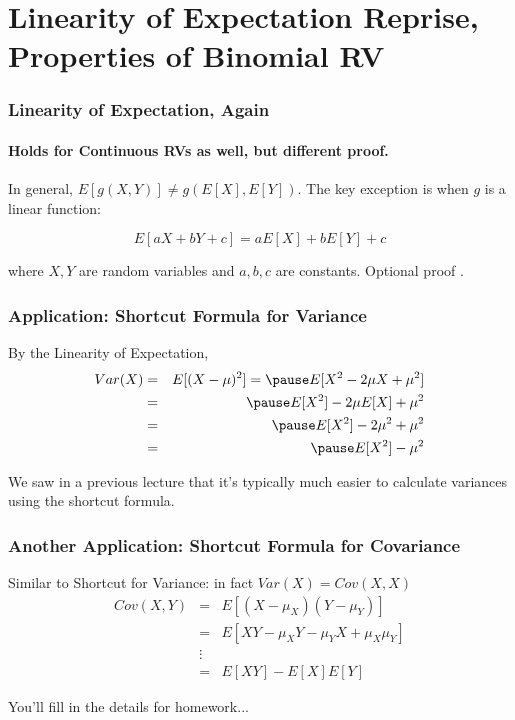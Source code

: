\section{Linearity of Expectation Reprise, Properties of Binomial RV}

\begin{frame}
\frametitle{Linearity of Expectation, Again}
\framesubtitle{Holds for Continuous RVs as well, but different proof.}
In general, $E[g(X,Y)]\neq g(E[X],E[Y])$. The key exception is when $g$ is a linear function:

\Large
$$\boxed{E[aX + bY + c] = aE[X] + bE[Y] + c}$$

\normalsize
where $X,Y$ are random variables and $a,b,c$ are constants.
Optional proof \textcolor{blue}{\href{http://ditraglia.com/Econ103Public/OptionalProofs.pdf}{}}.
\end{frame}

\begin{frame}
\frametitle{Application: Shortcut Formula for Variance}

By the Linearity of Expectation, 
\begin{eqnarray*}
	Var(X) &=&  E[(X - \mu)^2] = \pause E[X^2 - 2\mu X + \mu^2]\\
		&=& \pause E[X^2] - 2\mu E[X] + \mu^2\\
		&=& \pause E[X^2] - 2\mu^2 + \mu^2\\
		&=& \pause E[X^2] - \mu^2
\end{eqnarray*}

\alert{We saw in a previous lecture that it's typically much easier to calculate variances using the shortcut formula.}

\end{frame}


\begin{frame}
\frametitle{Another Application: Shortcut Formula for Covariance}
\alert{Similar to Shortcut for Variance: in fact $Var(X) = Cov(X,X)$}
\begin{eqnarray*}
	Cov(X,Y)&=& E[(X - \mu_X)(Y-\mu_Y)]\\
			&=& E[XY - \mu_X Y - \mu_Y X + \mu_X \mu_Y]\\
			&\vdots& \\
			&=& E[XY] - E[X]E[Y]
\end{eqnarray*}

\hfill \alert{You'll fill in the details for homework...}
\end{frame}


